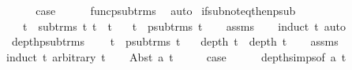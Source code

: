 \begin{isabellebody}
\ \ \isamarkupfalse%
\ \isamarkupfalse%
\ {\isacharquery}{\kern0pt}case\isanewline
\ \ \ \ \isamarkupfalse%
\ func{\isacharunderscore}{\kern0pt}psub{\isacharunderscore}{\kern0pt}trms\ \isamarkupfalse%
\ auto\isanewline
{}\isamarkupfalse%
%
\endisatagproof
{\isafoldproof}%
%
\isadelimproof
\isanewline
%
\endisadelimproof
\isanewline
{}\isamarkupfalse%
\ if{\isacharunderscore}{\kern0pt}sub{\isacharunderscore}{\kern0pt}not{\isacharunderscore}{\kern0pt}eq{\isacharunderscore}{\kern0pt}then{\isacharunderscore}{\kern0pt}psub{\isacharcolon}{\kern0pt}\ \isanewline
\ \ \ {\isachardoublequoteopen}t{}\ {\isasymin}\ sub{\isacharunderscore}{\kern0pt}trms\ t{}{\isachardoublequoteclose}\ {\isachardoublequoteopen}t{}\ {\isasymnoteq}\ t{}{\isachardoublequoteclose}\isanewline
\ \ \ {\isachardoublequoteopen}t{}\ {\isasymin}\ psub{\isacharunderscore}{\kern0pt}trms\ t{}{\isachardoublequoteclose}\isanewline
%
\isadelimproof
\ \ %
\endisadelimproof
%
\isatagproof
{}\isamarkupfalse%
\ assms\isanewline
\ \ \isamarkupfalse%
\ {\isacharparenleft}{\kern0pt}induct\ t{}{\isacharparenright}{\kern0pt}\ auto%
\endisatagproof
{\isafoldproof}%
%
\isadelimproof
\isanewline
%
\endisadelimproof
\isanewline
\isanewline
{}\isamarkupfalse%
\ depth{\isacharunderscore}{\kern0pt}psub{\isacharunderscore}{\kern0pt}trms{\isacharcolon}{\kern0pt}\ \isanewline
\ \ \ {\isachardoublequoteopen}t{}\ {\isasymin}\ psub{\isacharunderscore}{\kern0pt}trms\ t{}{\isachardoublequoteclose}\isanewline
\ \ \ {\isachardoublequoteopen}depth\ t{}\ {\isacharless}{\kern0pt}\ depth\ t{}{\isachardoublequoteclose}\isanewline
%
\isadelimproof
\ \ %
\endisadelimproof
%
\isatagproof
{}\isamarkupfalse%
\ assms\isanewline
{}\isamarkupfalse%
{\isacharparenleft}{\kern0pt}induct\ t{}\ arbitrary{\isacharcolon}{\kern0pt}\ t{}{\isacharparenright}{\kern0pt}\isanewline
\ \ \isamarkupfalse%
\ {\isacharparenleft}{\kern0pt}Abst\ a\ t{\isacharparenright}{\kern0pt}\isanewline
\ \ \isamarkupfalse%
\ \isamarkupfalse%
\ {\isacharquery}{\kern0pt}case\isanewline
\ \ \ \ \isamarkupfalse%
\ depth{\isachardot}{\kern0pt}simps{\isacharparenleft}{\kern0pt}{}{\isacharparenright}{\kern0pt}{\isacharbrackleft}{\kern0pt}of\ a\ t{\isacharbrackright}{\kern0pt}\isanewline

\end{isabellebody}
